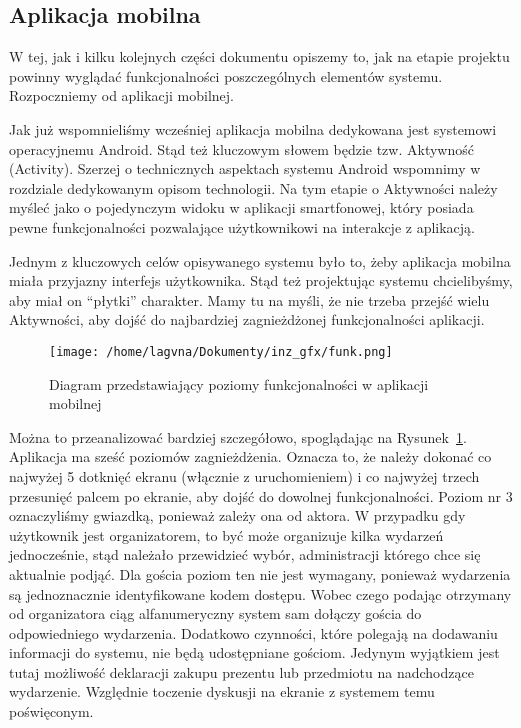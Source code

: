 \documentclass[12pt,titlepage]{article}
\begin{document}

\subsection{Aplikacja mobilna}
W tej, jak i kilku kolejnych części dokumentu opiszemy to, jak na etapie projektu powinny wyglądać funkcjonalności poszczególnych elementów systemu. Rozpoczniemy od aplikacji mobilnej.

Jak już wspomnieliśmy wcześniej aplikacja mobilna dedykowana jest systemowi operacyjnemu Android. Stąd też kluczowym słowem będzie tzw. Aktywność (Activity). Szerzej o technicznych aspektach
systemu Android wspomnimy w rozdziale dedykowanym opisom technologii. Na tym etapie o Aktywności należy myśleć jako o pojedynczym widoku w aplikacji smartfonowej, który posiada pewne funkcjonalności
pozwalające użytkownikowi na interakcje z aplikacją.

Jednym z kluczowych celów opisywanego systemu było to, żeby aplikacja mobilna miała przyjazny interfejs użytkownika. Stąd też projektując systemu chcielibyśmy, aby miał on ``płytki'' charakter.
Mamy tu na myśli, że nie trzeba przejść wielu Aktywności, aby dojść do najbardziej zagnieżdżonej funkcjonalności aplikacji.

\begin{figure}
\begin{center}
 \texttt{[image: /home/lagvna/Dokumenty/inz\_gfx/funk.png]}
 \caption{Diagram przedstawiający poziomy funkcjonalności w aplikacji mobilnej}
 \label{fig:funk}
\end{center}
\end{figure}

Można to przeanalizować bardziej szczegółowo, spoglądając na Rysunek~\ref{fig:funk}. Aplikacja ma sześć poziomów zagnieżdżenia. Oznacza to, że należy dokonać co najwyżej 5 dotknięć ekranu 
(włącznie z uruchomieniem) i co najwyżej trzech przesunięć palcem po ekranie, aby dojść do dowolnej funkcjonalności. Poziom nr 3 oznaczyliśmy gwiazdką, ponieważ zależy ona od aktora.
W przypadku gdy użytkownik jest organizatorem, to być może organizuje kilka wydarzeń jednocześnie, stąd należało przewidzieć wybór, administracji którego chce się aktualnie podjąć.
Dla gościa poziom ten nie jest wymagany, ponieważ wydarzenia są jednoznacznie identyfikowane kodem dostępu. Wobec czego podając otrzymany od organizatora ciąg alfanumeryczny system
sam dołączy gościa do odpowiedniego wydarzenia.
Dodatkowo czynności, które polegają na dodawaniu informacji do systemu, nie będą udostępniane gościom. Jedynym wyjątkiem jest tutaj możliwość deklaracji zakupu prezentu lub przedmiotu
na nadchodzące wydarzenie. Względnie toczenie dyskusji na ekranie z systemem temu poświęconym.
\end{document}

